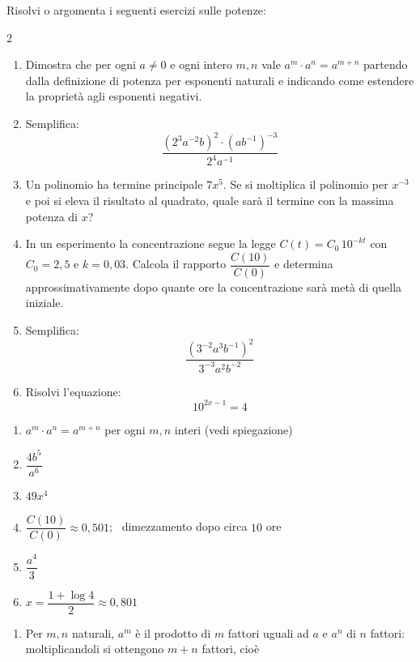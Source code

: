 \begin{question}[ID=1.5, subtitle={Esercizi avanzati sulle potenze}, tags={potenze, esercizi misti}, difficulty=difficile]
Risolvi o argomenta i seguenti esercizi sulle potenze:
\begin{multicols}{2}
\begin{enumerate}[leftmargin=3.2cm]
    \item Dimostra che per ogni $a\neq0$ e ogni intero $m,n$ vale $a^{m}\cdot a^{n}=a^{m+n}$ partendo dalla definizione di potenza per esponenti naturali e indicando come estendere la proprietà agli esponenti negativi.
    \item Semplifica:
    \[
    \dfrac{(2^{3}a^{-2}b)^{2}\cdot (ab^{-1})^{-3}}{2^{4}a^{-1}}
    \]
    \item Un polinomio ha termine principale $7x^{5}$. Se si moltiplica il polinomio per $x^{-3}$ e poi si eleva il risultato al quadrato, quale sarà il termine con la massima potenza di $x$?
    \item In un esperimento la concentrazione segue la legge $C(t)=C_{0}\,10^{-kt}$ con $C_{0}=2{,}5$ e $k=0{,}03$. Calcola il rapporto $\dfrac{C(10)}{C(0)}$ e determina approssimativamente dopo quante ore la concentrazione sarà metà di quella iniziale.
    \item Semplifica:
    \[
    \dfrac{(3^{-2}a^3b^{-1})^2}{3^{-3}a^2b^{-2}}
    \]
    \item Risolvi l'equazione:
    \[
    10^{2x-1}=4
    \]
\end{enumerate}
\end{multicols}
\begin{solution}
\begin{enumerate}
    \item $a^m\cdot a^n=a^{m+n}$ per ogni $m,n$ interi (vedi spiegazione)
    \item $\dfrac{4b^5}{a^6}$
    \item $49x^4$
    \item $\dfrac{C(10)}{C(0)}\approx0{,}501$; \ dimezzamento dopo circa $10$ ore
    \item $\dfrac{a^4}{3}$
    \item $x=\dfrac{1+\log4}{2}\approx0{,}801$
\end{enumerate}
\end{solution}
\begin{explanation}
\begin{enumerate}
    \item Per $m,n$ naturali, $a^m$ è il prodotto di $m$ fattori uguali ad $a$ e $a^n$ di $n$ fattori: moltiplicandoli si ottengono $m+n$ fattori, cioè

\end{enumerate}
\end{explanation}
\end{question}
